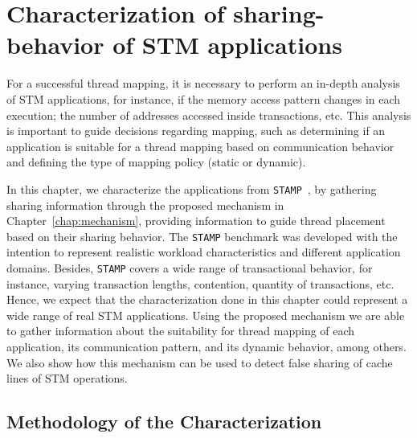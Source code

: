 \chapter{Characterization of sharing-behavior of STM applications}\label{chap:charact}

For a successful thread mapping, it is necessary to perform an in-depth analysis of STM applications, for instance, if the memory access pattern changes in each execution; the number of addresses accessed inside transactions, etc. This analysis is important to guide decisions regarding mapping, such as determining if an application is suitable for a thread mapping based on communication behavior and defining the type of mapping policy (static or dynamic). %

In this chapter, we characterize the applications from \texttt{STAMP}~\cite{STAMP}, by gathering sharing information through the proposed mechanism in Chapter~\ref{chap:mechanism}, providing information to guide thread placement based on their sharing behavior. The \texttt{STAMP} benchmark was developed with the intention to represent realistic workload characteristics and different application domains. Besides, \texttt{STAMP} covers a wide range of transactional behavior, for instance, varying transaction lengths, contention, quantity of transactions, etc. Hence, we expect that the characterization done in this chapter could represent a wide range of real STM applications. Using the proposed mechanism we are able to gather information about the suitability for thread mapping of each application, its communication pattern, and its dynamic behavior, among others. We also show how this mechanism can be used to detect false sharing of cache lines of STM operations.


\section{Methodology of the Characterization}\label{sec:methodology}


